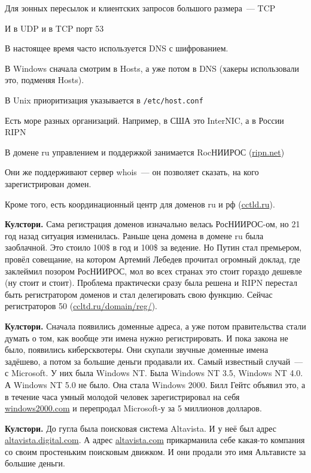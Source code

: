 Для зонных пересылок и клиентских запросов большого размера~--- TCP

И в UDP и в TCP порт 53

В настоящее время часто используется DNS с шифрованием.


В Windows сначала смотрим в Hosts, а уже потом в DNS (хакеры использовали это, подменяя Hosts).

В Unix приоритизация указывается в {\tt /etc/host.conf}


Есть море разных организаций. Например, в США это InterNIC, а в России RIPN

В домене ru управлением и поддержкой занимается RocНИИРОС (\url{ripn.net})

Они же поддерживают сервер whois~--- он позволяет сказать, на кого зарегистрирован домен.

Кроме того, есть координационный центр для доменов ru и рф (\url{cctld.ru}).

{\bf Кулстори.} Сама регистрация доменов изначально велась РосНИИРОС-ом, но 21 год назад ситуация изменилась. Раньше цена домена в домене ru была заоблачной. Это стоило 100\$ в год и 100\$ за ведение. Но Путин стал премьером, провёл совещание, на котором Артемий Лебедев прочитал огромный доклад, где заклеймил позором РосНИИРОС, мол во всех странах это стоит гораздо дешевле (ну стоит и стоит). Проблема практически сразу была решена и RIPN перестал быть регистратором доменов и стал делегировать свою функцию. Сейчас регистраторов 50 (\url{ccltd.ru/domain/reg/}).

{\bf Кулстори.} Сначала появились доменные адреса, а уже потом правительства стали думать о том, как вообще эти имена нужно регистрировать. И пока закона не было, появились киберсквотеры. Они скупали звучные доменные имена задёшево, а потом за большие деньги продавали их. Самый известный случай~--- с Microsoft. У них была Windows NT. Была Windows NT 3.5, Windows NT 4.0. А Windows NT 5.0 не было. Она стала Windows 2000. Билл Гейтс объявил это, а в течение часа умный молодой человек зарегистрировал на себя \url{windows2000.com} и перепродал Microsoft-у за 5 миллионов долларов.

{\bf Кулстори.} До гугла была поисковая система Altavista. И у неё был адрес \url{altavista.digital.com}. А адрес \url{altavista.com} прикарманила себе какая-то компания со своим простеньким поисковым движком. И они продали это имя Альтависте за большие деньги. 


